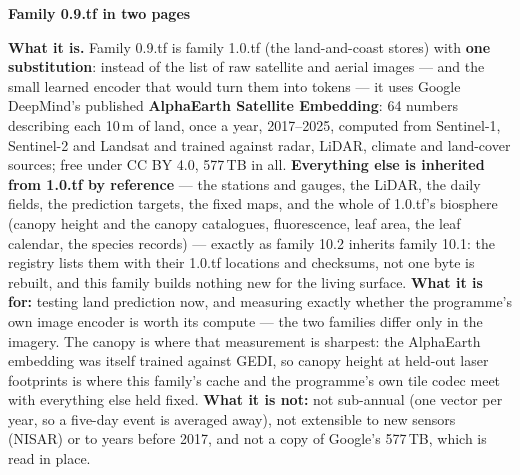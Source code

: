 \documentclass[10pt]{article}
\begin{document}
{\LARGE\bfseries Family 0.9.tf in two pages\par}
\vspace{2pt}{\large family 1.0.tf with its raw imagery replaced by Google's AlphaEarth embedding\par}
\vspace{2pt}{\small blauewelt/earth --- two-page summary of the design note, 20 September 2026. A glossary of every term follows the two pages.\par}
\vspace{4pt}

\textbf{What it is.} Family 0.9.tf is family 1.0.tf (the land-and-coast stores) with \textbf{one substitution}:
instead of the list of raw satellite and aerial images --- and the small learned encoder that would turn them into
tokens --- it uses Google DeepMind's published \textbf{AlphaEarth Satellite Embedding}: 64 numbers describing each
10\,m of land, once a year, 2017--2025, computed from Sentinel-1, Sentinel-2 and Landsat and trained against radar,
LiDAR, climate and land-cover sources; free under CC BY 4.0, 577\,TB in all. \textbf{Everything else is inherited
from 1.0.tf by reference} --- the stations and gauges, the LiDAR, the daily fields, the prediction targets, the
fixed maps, and the whole of 1.0.tf's biosphere (canopy height and the canopy catalogues, fluorescence, leaf area,
the leaf calendar, the species records) --- exactly as family 10.2 inherits family 10.1: the registry lists them
with their 1.0.tf locations and checksums, not one byte is rebuilt, and this family builds nothing new for the
living surface. \textbf{What it is for:} testing land prediction now, and measuring
exactly whether the programme's own image encoder is worth its compute --- the two families differ only in the
imagery. The canopy is where that measurement is sharpest: the AlphaEarth embedding was itself trained against
GEDI, so canopy height at held-out laser footprints is where this family's cache and the programme's own tile
codec meet with everything else held fixed. \textbf{What it is not:} not sub-annual (one vector per year, so a five-day event is averaged away), not
extensible to new sensors (NISAR) or to years before 2017, and not a copy of Google's 577\,TB, which is read in place.
\end{document}

